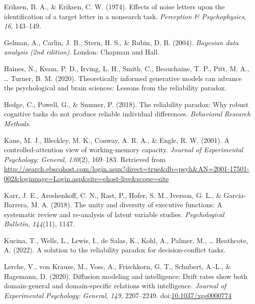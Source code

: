 \documentclass[
  ,man]{apa6}
\newlength{\cslhangindent}
\newlength{\cslentryspacingunit} %
\newenvironment{CSLReferences}[2] %
 {%
  \setlength{\parindent}{0pt}
  \ifodd #1
  \let\oldpar\par
  \def\par{\hangindent=\cslhangindent\oldpar}
  \fi
  \setlength{\parskip}{#2\cslentryspacingunit}
 }%
 {}
\begin{document}
\begin{CSLReferences}{1}{0}
\leavevmode{}%
Eriksen, B. A., \& Eriksen, C. W. (1974). Effects of noise letters upon the identification of a target letter in a nonsearch task. \emph{Perception \& Psychophysics}, \emph{16}, 143--149.

\leavevmode{}%
Gelman, A., Carlin, J. B., Stern, H. S., \& Rubin, D. B. (2004). \emph{Bayesian data analysis (2nd edition)}. {London}: {Chapman and Hall}.

\leavevmode{}%
Haines, N., Kvam, P. D., Irving, L. H., Smith, C., Beauchaine, T. P., Pitt, M. A., \ldots{} Turner, B. M. (2020). Theoretically informed generative models can advance the psychological and brain sciences: {Lessons} from the reliability paradox.

\leavevmode{}%
Hedge, C., Powell, G., \& Sumner, P. (2018). The reliability paradox: {Why} robust cognitive tasks do not produce reliable individual differences. \emph{Behavioral Research Methods}.

\leavevmode{}%
Kane, M. J., Bleckley, M. K., Conway, A. R. A., \& Engle, R. W. (2001). A controlled-attention view of working-memory capacity. \emph{Journal of Experimental Psychology: General}, \emph{130}(2), 169--183. Retrieved from \url{http://search.ebscohost.com/login.aspx?direct=true\&db=psyh\&AN=2001-17501-002\&loginpage=Login.asp\&site=ehost-live\&scope=site}

\leavevmode{}%
Karr, J. E., Areshenkoff, C. N., Rast, P., Hofer, S. M., Iverson, G. L., \& Garcia-Barrera, M. A. (2018). The unity and diversity of executive functions: {A} systematic review and re-analysis of latent variable studies. \emph{Psychological Bulletin}, \emph{144}(11), 1147.

\leavevmode{}%
Kucina, T., Wells, L., Lewis, I., de Salas, K., Kohl, A., Palmer, M., \ldots{} Heathcote, A. (2022). A solution to the reliability paradox for decision-conflict tasks.

\leavevmode{}%
Lerche, V., von Krause, M., Voss, A., Frischkorn, G. T., Schubert, A.-L., \& Hagemann, D. (2020). Diffusion modeling and intelligence: {Drift} rates show both domain-general and domain-specific relations with intelligence. \emph{Journal of Experimental Psychology: General}, \emph{149}, 2207--2249. doi:\href{https://doi.org/10.1037/xge0000774}{10.1037/xge0000774}


\end{CSLReferences}
\end{document}
